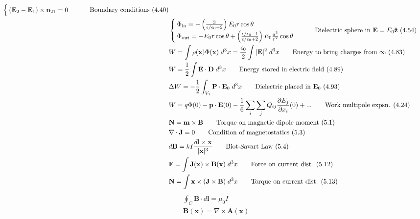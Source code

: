 \documentclass[10pt]{article}
\newcommand{\zhat}{\boldsymbol{\hat{\textbf{z}}}}
\newcommand{\ve}[1]{\boldsymbol{\mathbf{#1}}}
\newcommand{\vect}[1]{\boldsymbol{\mathbf{#1}}}
\newcommand{\eo}{\epsilon_0}
\newcommand{\pder}[2]{\frac{\partial #1}{\partial #2}}
\begin{document}
\begin{multicols}{2}
\begin{align*}
\begin{cases}
			(\vect{E}_2 - \vect{E}_1) \times \vect{n}_{21} = 0 \\
		\end{cases}	\tag*{Boundary conditions (4.40)} \\
		&\begin{cases}
			\Phi_{\text{in}} = - \left( \frac{3}{\epsilon/\eo + 2} \right) E_0 r \cos \theta \\ 
			\Phi_{\text{out}} = - E_0 r \cos \theta + \left( \frac{\epsilon/\eo - 1}{\epsilon/\eo + 2} \right) E_0 \frac{a^3}{r^2} \cos \theta 
		\end{cases} \tag*{Dielectric sphere in $\vect{E} = E_0 \zhat$ (4.54)} \\
		& W = \int \rho(\vect{x}) \Phi(\vect{x})\; d^3x = \frac{\eo}{2} \int |\ve{E}|^2 \; d^3 x\tag*{Energy to bring charges from $\infty$ (4.83)} \\	
		& W = \frac{1}{2} \int \vect{E} \cdot \vect{D} \; d^3x \tag*{Energy stored in electric field (4.89)} \\
		& \Delta W = - \frac{1}{2} \int_{V_1} \vect{P} \cdot \vect{E}_0 \; d^3 x \tag*{Dielectric placed in $\vect{E}_0$ (4.93)} \\
		& W = q \Phi(0) - \vect{p} \cdot \vect{E}(0) - \frac{1}{6} \sum_i \sum_j Q_{ij} \pder{E_j}{x_i}(0) + ... \tag*{Work multipole expsn. (4.24)} \\
		& \vect{N} = \vect{m} \times \vect{B} \tag*{Torque on magnetic dipole moment (5.1)} \\
		& \nabla \cdot \vect{J} = 0 \tag*{Condition of magnetostatics (5.3)} \\
		& d \vect{B} = k I \frac{d \vect{l} \times \vect{x}}{|\vect{x}|^3} \tag*{Biot-Savart Law (5.4)} \\
		& \vect{F} = \int \vect{J}(\vect{x}) \times \vect{B}(\vect{x}) \; d^3 x \tag*{Force on current dist. (5.12)} \\
		& \vect{N} = \int \vect{x} \times (\vect{J} \times \vect{B}) \; d^3 x \tag*{Torque on current dist. (5.13)} \\
	\end{align*}
	\setlength{\abovedisplayskip}{-25pt}
	\setlength{\belowdisplayskip}{0pt}
	\setlength{\abovedisplayshortskip}{0pt}
	\setlength{\belowdisplayshortskip}{0pt}
	\begin{align*} 
		& \oint_C \vect{B} \cdot d \vect{l} = \mu_0 I \tag*{Amp\`ere's law (5.25)}\\
		& \vect{B}(\vect{x}) = \nabla \times \vect{A}(\vect{x}) \tag*{Magnetic vector potential (5.27)} \\

\end{align*}
\end{multicols}
\end{document}
